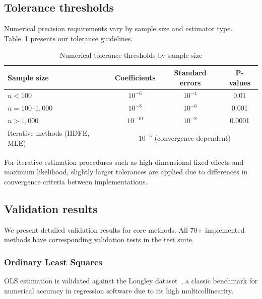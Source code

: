 \subsection{Tolerance thresholds} \label{sec:validation-tolerance}

Numerical precision requirements vary by sample size and estimator type.
Table~\ref{tab:tolerance-thresholds} presents our tolerance guidelines.

\begin{table}[htbp]
\centering
\caption{Numerical tolerance thresholds by sample size}
\label{tab:tolerance-thresholds}
\begin{tabular}{lccc}
\toprule
Sample size & Coefficients & Standard errors & P-values \\
\midrule
$n < 100$ & $10^{-6}$ & $10^{-4}$ & 0.01 \\
$n = 100$--$1{,}000$ & $10^{-8}$ & $10^{-6}$ & 0.001 \\
$n > 1{,}000$ & $10^{-10}$ & $10^{-8}$ & 0.0001 \\
\midrule
Iterative methods (HDFE, MLE) & \multicolumn{3}{c}{$10^{-5}$ (convergence-dependent)} \\
\bottomrule
\end{tabular}
\end{table}

For iterative estimation procedures such as high-dimensional fixed effects
and maximum likelihood, slightly larger tolerances are applied due to
differences in convergence criteria between implementations.


\subsection{Validation results} \label{sec:validation-results}

We present detailed validation results for core methods. All 70+ implemented
methods have corresponding validation tests in the test suite.

\subsubsection{Ordinary Least Squares}

OLS estimation is validated against the Longley dataset~\citep{Longley:1967},
a classic benchmark for numerical accuracy in regression software due to its
high multicollinearity.

